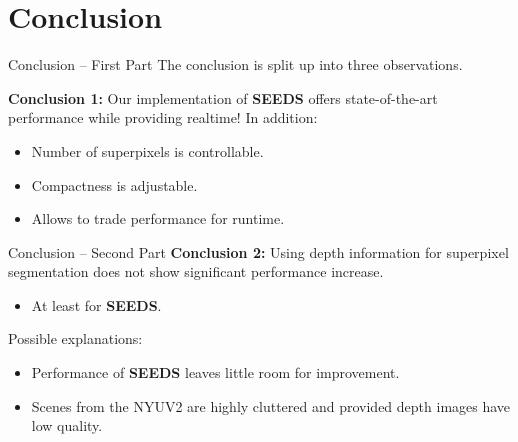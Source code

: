 \documentclass[handout]{beamer}
\begin{document}
%		
%		
	
	\section{Conclusion}
	\begin{frame}{Conclusion -- First Part}
		The conclusion is split up into three observations.
		\vskip 0.5cm
		
		\textbf{Conclusion 1:} Our implementation of \textbf{SEEDS} offers state-of-the-art performance while providing realtime!
		\vskip 0.25cm
		In addition:
		\vskip 0.25cm
		\begin{itemize}[label=--]
			\item Number of superpixels is controllable.
			\item Compactness is adjustable.
			\item Allows to trade performance for runtime.
		\end{itemize}
	\end{frame}
	
	\begin{frame}{Conclusion -- Second Part}
		\textbf{Conclusion 2:} Using depth information for superpixel segmentation does not show significant performance increase.
		\vskip 0.25cm
		\begin{itemize}[label=--]
			\item At least for \textbf{SEEDS}.
		\end{itemize}
		\vskip 0.25cm
		
		Possible explanations:
		\vskip 0.25cm
		\begin{itemize}[label=--]
			\item Performance of \textbf{SEEDS} leaves little room for improvement.
			\item Scenes from the NYUV2 are highly cluttered and provided depth images have low quality.
		\end{itemize}
	\end{frame}
\end{document}
